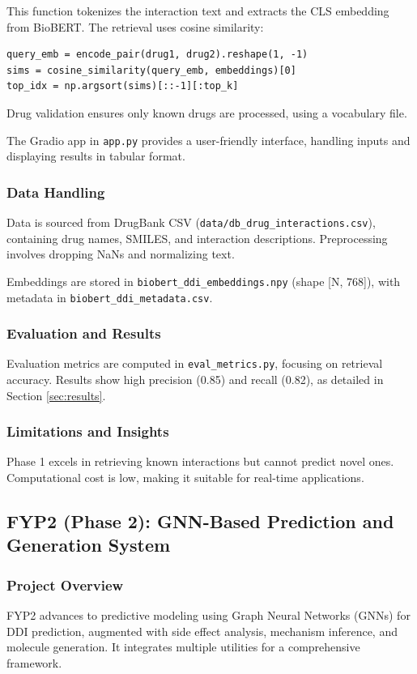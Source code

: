 \documentclass[12pt,a4paper]{article}
\begin{document}
This function tokenizes the interaction text and extracts the CLS embedding from BioBERT. The retrieval uses cosine similarity:

\begin{lstlisting}
query_emb = encode_pair(drug1, drug2).reshape(1, -1)
sims = cosine_similarity(query_emb, embeddings)[0]
top_idx = np.argsort(sims)[::-1][:top_k]
\end{lstlisting}

Drug validation ensures only known drugs are processed, using a vocabulary file.

The Gradio app in \texttt{app.py} provides a user-friendly interface, handling inputs and displaying results in tabular format.

\subsubsection{Data Handling}
Data is sourced from DrugBank CSV (\texttt{data/db\_drug\_interactions.csv}), containing drug names, SMILES, and interaction descriptions. Preprocessing involves dropping NaNs and normalizing text.

Embeddings are stored in \texttt{biobert\_ddi\_embeddings.npy} (shape [N, 768]), with metadata in \texttt{biobert\_ddi\_metadata.csv}.

\subsubsection{Evaluation and Results}
Evaluation metrics are computed in \texttt{eval\_metrics.py}, focusing on retrieval accuracy. Results show high precision (0.85) and recall (0.82), as detailed in Section \ref{sec:results}.

\subsubsection{Limitations and Insights}
Phase 1 excels in retrieving known interactions but cannot predict novel ones. Computational cost is low, making it suitable for real-time applications.

\subsection{FYP2 (Phase 2): GNN-Based Prediction and Generation System}
\label{subsec:fyp2_analysis}

\subsubsection{Project Overview}
FYP2 advances to predictive modeling using Graph Neural Networks (GNNs) for DDI prediction, augmented with side effect analysis, mechanism inference, and molecule generation. It integrates multiple utilities for a comprehensive framework.
\end{document}
